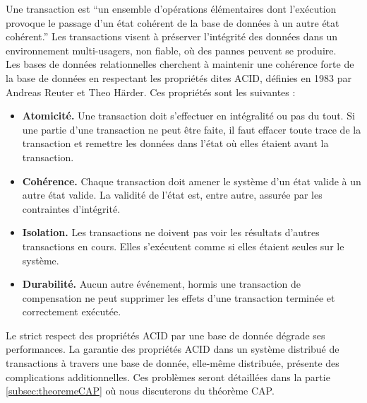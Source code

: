 Une transaction est \enquote{un ensemble d'opérations élémentaires dont l'exécution provoque le passage d'un état cohérent de la base de données à un autre état cohérent.}\cite{cours_bdd_insa} Les transactions visent à préserver l'intégrité des données dans un environnement multi-usagers, non fiable, où des pannes peuvent se produire.\\

Les bases de données relationnelles cherchent à maintenir une cohérence forte de la base de données en respectant les propriétés dites ACID, définies en 1983 par Andreas Reuter et Theo Härder. Ces propriétés sont les suivantes :
\vspace{10px}
\begin{itemize}
	\item \textbf{Atomicité.} Une transaction doit s'effectuer en intégralité ou pas du tout. Si une partie d'une transaction ne peut être faite, il faut effacer toute trace de la transaction et remettre les données dans l'état où elles étaient avant la transaction.
	\item \textbf{Cohérence.} Chaque transaction doit amener le système d'un état valide à un autre état valide. La validité de l'état est, entre autre, assurée par les contraintes d'intégrité.
	\item \textbf{Isolation.} Les transactions ne doivent pas voir les résultats d'autres transactions en cours. Elles s'exécutent comme si elles étaient seules sur le système.
	\item \textbf{Durabilité.} Aucun autre événement, hormis une transaction de compensation ne peut supprimer les effets d'une transaction terminée et correctement exécutée.
\end{itemize}
\vspace{20px}
Le strict respect des propriétés ACID par une base de donnée dégrade ses performances. La garantie des propriétés ACID dans un système distribué de transactions à travers une base de donnée, elle-même distribuée, présente des complications additionnelles. Ces problèmes seront détaillées dans la partie \ref{subsec:theoremeCAP} où nous discuterons du théorème CAP.